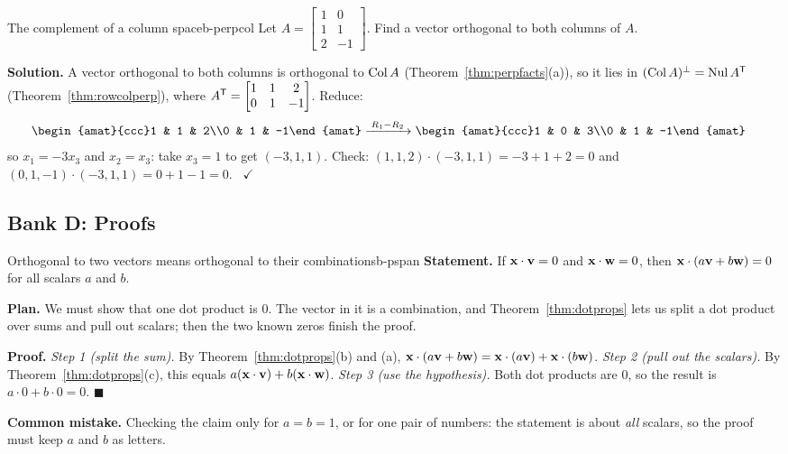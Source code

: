\documentclass[11pt]{article}
\begin{document}
\begin{exmp}{The complement of a column space}{b-perpcol}
Let $A=\begin{bmatrix}1&0\\1&1\\2&-1\end{bmatrix}$. Find a vector orthogonal to both columns of $A$.

\textbf{Solution.} A vector orthogonal to both columns is orthogonal to $\operatorname{Col} A$ (Theorem~\ref{thm:perpfacts}(a)), so it lies in $(\operatorname{Col} A)^{\perp}=\operatorname{Nul} A^{\mathsf T}$ (Theorem~\ref{thm:rowcolperp}), where $A^{\mathsf T}=\begin{bmatrix}1&1&2\\0&1&-1\end{bmatrix}$. Reduce:
\begin{align*}
\begin{amat}{ccc}1 & 1 & 2\\0 & 1 & -1\end{amat}
&\rops{R_1-R_2}
\begin{amat}{ccc}1 & 0 & 3\\0 & 1 & -1\end{amat}
\end{align*}
so $x_1=-3x_3$ and $x_2=x_3$: take $x_3=1$ to get $(-3,1,1)$. Check: $(1,1,2)\cdot(-3,1,1)=-3+1+2=0$ and $(0,1,-1)\cdot(-3,1,1)=0+1-1=0$. \ $\checkmark$
\end{exmp}

\subsection*{Bank D: Proofs}
\begin{exmp}{Orthogonal to two vectors means orthogonal to their combinations}{b-pspan}
\textbf{Statement.} If $\mathbf{x}\cdot\mathbf{v}=0$ and $\mathbf{x}\cdot\mathbf{w}=0$, then $\mathbf{x}\cdot(a\mathbf{v}+b\mathbf{w})=0$ for all scalars $a$ and $b$.

\textbf{Plan.} We must show that one dot product is $0$. The vector in it is a combination, and Theorem~\ref{thm:dotprops} lets us split a dot product over sums and pull out scalars; then the two known zeros finish the proof.

\textbf{Proof.}
\emph{Step 1 (split the sum).} By Theorem~\ref{thm:dotprops}(b) and (a), $\mathbf{x}\cdot(a\mathbf{v}+b\mathbf{w})=\mathbf{x}\cdot(a\mathbf{v})+\mathbf{x}\cdot(b\mathbf{w})$.
\emph{Step 2 (pull out the scalars).} By Theorem~\ref{thm:dotprops}(c), this equals $a(\mathbf{x}\cdot\mathbf{v})+b(\mathbf{x}\cdot\mathbf{w})$.
\emph{Step 3 (use the hypothesis).} Both dot products are $0$, so the result is $a\cdot0+b\cdot0=0$. \qquad$\blacksquare$

\textbf{Common mistake.} Checking the claim only for $a=b=1$, or for one pair of numbers: the statement is about \emph{all} scalars, so the proof must keep $a$ and $b$ as letters.
\end{exmp}
\end{document}
